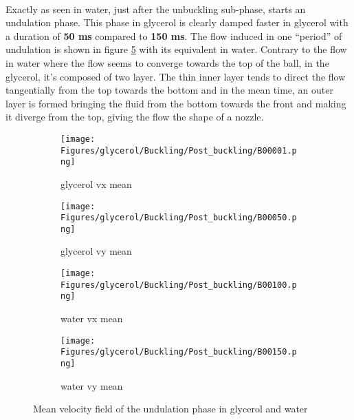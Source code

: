 \documentclass[a4paper,10pt]{report}
\begin{document}
\paragraph{}
Exactly as seen in water, just after the unbuckling sub-phase, starts an undulation phase. This phase in glycerol is clearly damped faster in glycerol with a duration of \textbf{50 ms} compared to \textbf{150 ms}. 
The flow induced in one ``period'' of undulation is shown in figure \ref{fig:Meanvelocityfieldoftheundulationphaseinglycerolandwater} with its equivalent in water.
Contrary to the flow in water where  the flow seems to converge towards the top of the ball, in the glycerol, it's composed of two layer. The thin inner layer tends to direct the flow tangentially from the top towards the bottom and in the mean time, an outer layer is formed bringing the fluid from the bottom towards the front and making it diverge from the top, giving the flow the shape of a nozzle.
\begin{figure}[htbp]%
	\centering%
		\begin{subfigure}[h]{0.5\textwidth}%
					\texttt{[image: Figures/glycerol/Buckling/Post\_buckling/B00001.png]}%
					\caption{glycerol vx mean}%
					\label{fig:vxmeanglycerol}%
			\end{subfigure}%
			\begin{subfigure}[h]{0.5\linewidth}%
					\texttt{[image: Figures/glycerol/Buckling/Post\_buckling/B00050.png]}%
					\caption{glycerol vy mean}%
					\label{fig:vymeanglycerol}%
			\end{subfigure}%
			
			\begin{subfigure}[h]{0.5\textwidth}%
					\texttt{[image: Figures/glycerol/Buckling/Post\_buckling/B00100.png]}%
					\caption{water vx mean}%
					\label{fig:vxmeanwater}%
			\end{subfigure}%
			\begin{subfigure}[h]{0.5\linewidth}%
					\texttt{[image: Figures/glycerol/Buckling/Post\_buckling/B00150.png]}%
					\caption{water vy mean}%
					\label{fig:vymeanwater}%
			\end{subfigure}%
			
		\caption{Mean velocity field of the undulation phase in glycerol and water}
		\label{fig:Meanvelocityfieldoftheundulationphaseinglycerolandwater}%
\end{figure}
\end{document}
